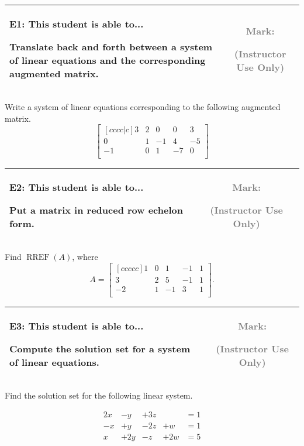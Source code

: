 \documentclass[12pt]{article}
\newcommand{\standardQuestion}[2]{
\begin{center}
  \begin{tabular}{|l|c|}
  \hline
    \parbox{5in}{
      \textbf{#1}: This student is able to...\\
      #2
    }
  &
    \parbox{1in}{
      \vspace{0.1in}
      \footnotesize \textcolor{gray}{Mark:}
      \vspace{0.7in}

      \tiny \textcolor{gray}{(Instructor Use Only)}
    }
  \\\hline
  \end{tabular}
\end{center}
}
\begin{document}
\begin{center}
\end{center}



\standardQuestion{E1}{
  Translate back and forth between a system of linear equations and the corresponding augmented matrix.
}

Write a system of linear equations corresponding to the following
augmented matrix.
\[
\begin{bmatrix}[cccc|c]
3 & 2 & 0 & 0 & 3 \\
0 & 1 & -1 & 4 & -5 \\
-1 & 0 & 1 & -7 & 0 \\
\end{bmatrix}
\]


\newpage



\standardQuestion{E2}{
  Put a matrix in reduced row echelon form.
}

Find \(\operatorname{RREF}(A)\), where
\[
  A
=
  \begin{bmatrix}[ccccc]
  1 & 0 & 1 & -1 & 1 \\
  3 & 2 & 5 & -1 & 1 \\
  -2 & 1 & -1 & 3 & 1 \\
  \end{bmatrix}
.\]


\vfill

\newpage

\standardQuestion{E3}{
  Compute the solution set for a system of linear equations.
}

Find the solution set for the following linear system.

\[
\begin{array}{ccccc}
  2x &-y  &+3z & &=1 \\
  -x &+y  &-2z &+w  &=1 \\
  x  &+2y &-z  &+2w &=5 
\end{array}
\]

\vfill
\end{document}
